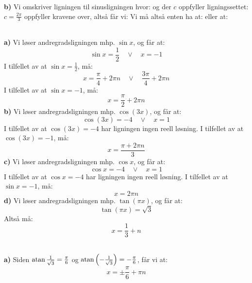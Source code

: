 \textbf{b)} Vi omskriver ligningen til sinusligningen
hvor:
og der $ c $ oppfyller ligningssettet:
$ c=\frac{2\pi}{3} $ oppfyller kravene over, altså får vi:
Vi må altså enten ha at:
eller at:

\\
\textbf{a)} Vi løser andregradsligningen mhp. $ \sin x $, og får at:
\[ \sin x = \frac{1}{2}\quad\vee\quad x= -1 \]
I tilfellet av at $ {\sin x = \frac{1}{2}} $, må:
\[ x = \frac{\pi}{4}+2\pi n\quad\vee\quad \frac{3\pi}{4}+2\pi n \]
I tilfellet av at $ {\sin x = -1} $, må:
\[ x = \frac{\pi}{2}+2\pi n\]
\textbf{b)} Vi løser andregradsligningen mhp. $ \cos (3x) $, og får at:
\[ \cos (3x) = -4\quad\vee\quad x= 1 \]
I tilfellet av at $ {\cos (3x) = -4} $ har ligningen ingen reell løsning. I tilfellet av at $ {\cos (3x) = -1} $, må:
\[ x = \frac{\pi +2\pi n}{3}\]
\textbf{c)} Vi løser andregradsligningen mhp. $ \cos x $, og får at:
\[ \cos x = -4\quad\vee\quad x= 1 \]
I tilfellet av at $ {\cos x = -4} $ har ligningen ingen reell løsning. I tilfellet av at $ {\sin x = -1} $, må:
\[ x = 2\pi n\]
\textbf{d)} Vi løser andregradsligningen mhp. $ \tan(\pi x) $, og får at:
\[ \tan(\pi x) = \sqrt{3}\]
Altså må:
\[ x = \frac{1}{3}+n\]

\\
\textbf{a)} 
Siden $ {\operatorname{atan} \frac{1}{\sqrt{3}}=\frac{\pi}{6}} $ og $ {\operatorname{atan} \left(-\frac{1}{\sqrt{3}}\right)=-\frac{\pi}{6}} $, får vi at:
\[ x = \pm \frac{\pi}{6}+\pi n \]

